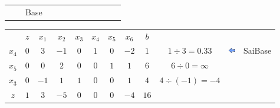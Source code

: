 \begin{frame}
{\begin{table}
\begin{tabular}{c c c c c c c c c c c c}
				& 
				&  \scriptsize Base
				& 
				& 
				& 
				& 
				&  
				&  
				& & & \\				
			\end{tabular}
		\end{table}
	}		
	{
		\begin{table}
			\begin{tabular}{c c c c c c c c c c c c}
				& \cellcolor{blue!80} \color{white} $ \scriptstyle z$
				& \cellcolor{blue!80} \color{white} $ \scriptstyle x_1$ 
				& \cellcolor{blue!80} \color{white} $ \scriptstyle x_2$
				& \cellcolor{blue!80} \color{red} $ \scriptstyle x_3$
				& \cellcolor{blue!80} \color{red} $ \scriptstyle x_4$
				& \cellcolor{blue!80} \color{red} $ \scriptstyle x_5$
				& \cellcolor{blue!80} \color{white} $ \scriptstyle x_6$ 
				& \cellcolor{blue!80} \color{white} $ \scriptstyle b$ \\
				\cellcolor{blue!80} \color{red} $ \scriptstyle x_4$
				& \cellcolor{gray!60}  $ \scriptstyle 0$
				& \cellcolor{red!60}  $ \scriptstyle 3$ 
				& \cellcolor{gray!60}  $ \scriptstyle -1$
				& \cellcolor{gray!60}  $ \scriptstyle 0$
				& \cellcolor{gray!60}  $ \scriptstyle 1$
				& \cellcolor{gray!60}  $ \scriptstyle 0$
				& \cellcolor{gray!60}  $ \scriptstyle -2$ 
				& \cellcolor{gray!60}  $ \scriptstyle 1$ 
				& $ \scriptstyle 1 \div 3 = 0.33 $
				& \includegraphics[width=0.3cm,height=0.3cm]{setaesquerda.jpg} 
				& \scriptsize SaiBase\\ 
				\cellcolor{blue!80} \color{red} $ \scriptstyle x_5$  
				& \cellcolor{yellow!60}  $ \scriptstyle 0$
				& \cellcolor{gray!60}  $ \scriptstyle 0$ 
				& \cellcolor{yellow!60}  $ \scriptstyle 2$
				& \cellcolor{yellow!60}  $ \scriptstyle 0$
				& \cellcolor{yellow!60}  $ \scriptstyle 0$
				& \cellcolor{yellow!60}  $ \scriptstyle 1$
				& \cellcolor{yellow!60}  $ \scriptstyle 1$ 
				& \cellcolor{gray!60}  $ \scriptstyle 6$ 
				& $ \scriptstyle 6 \div 0 = \infty $\\
				\cellcolor{blue!80} \color{red} $ \scriptstyle x_3$
				& \cellcolor{yellow!60}  $ \scriptstyle 0$
				& \cellcolor{gray!60}  $ \scriptstyle -1$ 
				& \cellcolor{yellow!60}  $ \scriptstyle 1$
				& \cellcolor{yellow!60}  $ \scriptstyle 1$
				& \cellcolor{yellow!60}  $ \scriptstyle 0$
				& \cellcolor{yellow!60}  $ \scriptstyle 0$
				& \cellcolor{yellow!60}  $ \scriptstyle 1$ 
				& \cellcolor{gray!60}  $ \scriptstyle 4$ 
				& $ \scriptstyle 4 \div (-1) = -4 $ \\
				\cellcolor{blue!80} \color{white} $ \scriptstyle z$
				& \cellcolor{yellow!60}  $ \scriptstyle 1$
				& \cellcolor{gray!60}  $ \scriptstyle 3$ 
				& \cellcolor{yellow!60}  $ \scriptstyle -5$
				& \cellcolor{yellow!60}  $ \scriptstyle 0$
				& \cellcolor{yellow!60}  $ \scriptstyle 0$
				& \cellcolor{yellow!60}  $ \scriptstyle 0$
				& \cellcolor{yellow!60}  $ \scriptstyle -4$ 
				& \cellcolor{gray!60}  $ \scriptstyle 16$ \\
				

\end{tabular}
\end{table}}
\end{frame}
